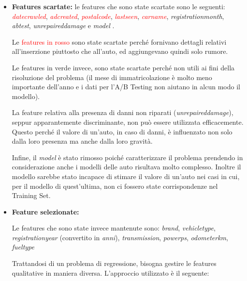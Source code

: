 \begin{itemize}
    \item \textbf{Features scartate:}
    le features che sono state scartate sono le seguenti: \textcolor{red}{\textit{date\textunderscore crawled}}, \textcolor{red}{\textit{ad\textunderscore created}}, \textcolor{red}{\textit{postal\textunderscore code}}, \textcolor{red}{\textit{last\textunderscore seen}}, \textcolor{red}{\textit{car\textunderscore name}}, \textcolor[HTML]{00AA00}{\textit{registration\textunderscore month}}, \textcolor[HTML]{00AA00}{\textit{ab\textunderscore test}}, \textit{unrepaired\textunderscore damage} e \textit{model} .    
    
    Le \textcolor{red}{features in rosso} sono state scartate perché fornivano dettagli relativi all'inserzione piuttosto che all'auto, ed aggiungevano quindi solo rumore.

    Le \textcolor[HTML]{00AA00}{features in verde} invece, sono state scartate perché non utili ai fini della risoluzione del problema (il mese di immatricolazione è molto meno importante dell'anno e i dati per l'A/B Testing non aiutano in alcun modo il modello).

    La feature relativa alla presenza di danni non riparati (\textit{unrepaired\textunderscore damage}), seppur apparantemente discriminante, non può essere utilizzata efficacemente. Questo perché il valore di un'auto, in caso di danni, è influenzato non solo dalla loro presenza ma anche dalla loro gravità.
    
    Infine, il \textit{model} è stato rimosso poiché caratterizzare il problema prendendo in considerazione anche i modelli delle auto risultava molto complesso. Inoltre il modello sarebbe stato incapace di stimare il valore di un'auto nei casi in cui, per il modello di quest'ultima, non ci fossero state corrispondenze nel Training Set.

    \medskip
    \item \textbf{Feature selezionate:}

    Le features che sono state invece mantenute sono: \textit{brand}, \mbox{\textit{vehicle\textunderscore type}}, \textit{registration\textunderscore year} (convertito in \textit{anni}), \textit{transmission}, \mbox{\textit{power\textunderscore ps}}, \mbox{\textit{odometer\textunderscore km}}, \textit{fuel\textunderscore type}


    Trattandosi di un problema di regressione, bisogna gestire le features qualitative in maniera diversa. L'approccio utilizzato è il seguente:
    \medskip
    

\end{itemize}
